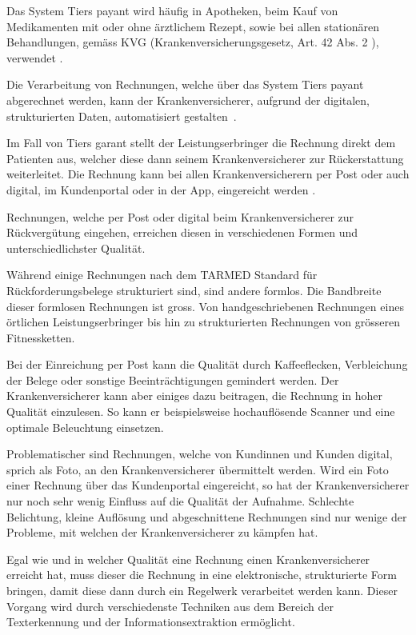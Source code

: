 Das System Tiers payant wird häufig in Apotheken, beim Kauf von Medikamenten mit oder ohne ärztlichem Rezept, sowie bei allen stationären Behandlungen, gemäss KVG (Krankenversicherungsgesetz, Art. 42 Abs. 2 ), verwendet \autocite{EDI2017}.

Die Verarbeitung von Rechnungen, welche über das System Tiers payant abgerechnet werden, kann der Krankenversicherer, aufgrund der digitalen, strukturierten Daten, automatisiert gestalten~\autocite{BAG2016}.

Im Fall von Tiers garant stellt der Leistungserbringer die Rechnung direkt dem Patienten aus, welcher diese dann seinem Krankenversicherer zur Rückerstattung weiterleitet. Die Rechnung kann bei allen Krankenversicherern per Post oder auch digital, im Kundenportal oder in der App, eingereicht werden \autocite{EDI2017}.

Rechnungen, welche per Post oder digital beim Krankenversicherer zur Rückvergütung eingehen, erreichen diesen in verschiedenen Formen und unterschiedlichster Qualität. 

Während einige Rechnungen nach dem TARMED Standard für Rückforderungsbelege strukturiert sind, sind andere formlos. Die Bandbreite dieser formlosen Rechnungen ist gross. Von handgeschriebenen Rechnungen eines örtlichen Leistungserbringer bis hin zu strukturierten Rechnungen von grösseren Fitnessketten.

Bei der Einreichung per Post kann die Qualität durch Kaffeeflecken, Verbleichung der Belege oder sonstige Beeinträchtigungen gemindert werden. Der Krankenversicherer kann aber einiges dazu beitragen, die Rechnung in hoher Qualität einzulesen. So kann er beispielsweise hochauflösende Scanner und eine optimale Beleuchtung einsetzen.

Problematischer sind Rechnungen, welche von Kundinnen und Kunden digital, sprich als Foto, an den Krankenversicherer übermittelt werden. Wird ein Foto einer Rechnung über das Kundenportal eingereicht, so hat der Krankenversicherer nur noch sehr wenig Einfluss auf die Qualität der Aufnahme. Schlechte Belichtung, kleine Auflösung und abgeschnittene Rechnungen sind nur wenige der Probleme, mit welchen der Krankenversicherer zu kämpfen hat.

Egal wie und in welcher Qualität eine Rechnung einen Krankenversicherer erreicht hat, muss dieser die Rechnung in eine elektronische, strukturierte Form bringen, damit diese dann durch ein Regelwerk verarbeitet werden kann. Dieser Vorgang wird durch verschiedenste Techniken aus dem Bereich der Texterkennung und der Informationsextraktion ermöglicht.

